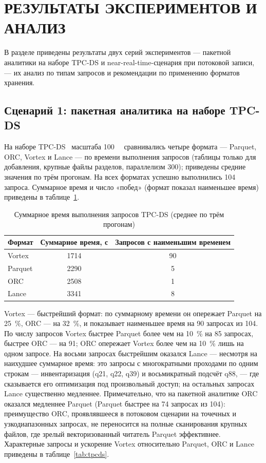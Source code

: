 \section{РЕЗУЛЬТАТЫ ЭКСПЕРИМЕНТОВ И АНАЛИЗ}

В разделе приведены результаты двух серий экспериментов --- пакетной аналитики на
наборе TPC-DS и near-real-time-сценария при потоковой записи, --- их анализ по типам
запросов и рекомендации по применению форматов хранения.

\subsection{Сценарий 1: пакетная аналитика на наборе TPC-DS}

На наборе TPC-DS~\cite{tpcds-spec} масштаба \SI{100}{\giga\byte} сравнивались
четыре формата --- Parquet, ORC, Vortex и Lance --- по времени выполнения запросов
(таблицы только для добавления, крупные файлы разделов, параллелизм 300); приведены
средние значения по трём прогонам. На всех форматах успешно выполнились
\num{104} запроса. Суммарное время и число «побед» (формат показал наименьшее время)
приведены в таблице~\ref{tab:tpcds-total}.

\begin{table}
    \caption{Суммарное время выполнения запросов TPC-DS (среднее по трём прогонам)}
    \label{tab:tpcds-total}
    \begin{tabularx}{\textwidth}{|X|c|c|}\hline
    \textbf{Формат} & \textbf{Суммарное время, с} & \textbf{Запросов с наименьшим временем} \\ \hline
    Vortex  & 1714 & 90 \\ \hline
    Parquet & 2290 & 5 \\ \hline
    ORC     & 2508 & 1 \\ \hline
    Lance   & 3341 & 8 \\ \hline
    \end{tabularx}
\end{table}

Vortex --- быстрейший формат: по суммарному времени он опережает Parquet на
\SI{25}{\percent}, ORC --- на \SI{32}{\percent}, и показывает наименьшее время на
\num{90} запросах из \num{104}. По числу запросов Vortex быстрее Parquet более чем
на \SI{10}{\percent} на \num{85} запросах, быстрее ORC --- на \num{91}; ORC
опережает Vortex более чем на \SI{10}{\percent} лишь на одном запросе. На восьми
запросах быстрейшим оказался Lance --- несмотря на наихудшее суммарное время: это
запросы с многократными проходами по одним строкам --- инвентаризация (q21, q22,
q39) и восьмикратный подсчёт q88, --- где сказывается его оптимизация под
произвольный доступ; на остальных запросах Lance существенно медленнее. Примечательно, что на пакетной аналитике ORC оказался медленнее Parquet
(Parquet быстрее на \num{74} запросах из \num{104}): преимущество ORC, проявлявшееся
в потоковом сценарии на точечных и узкодиапазонных запросах, не переносится на
полные сканирования крупных файлов, где зрелый векторизованный читатель Parquet
эффективнее. Характерные запросы и ускорение Vortex относительно Parquet, ORC и
Lance приведены в таблице~\ref{tab:tpcds}.

